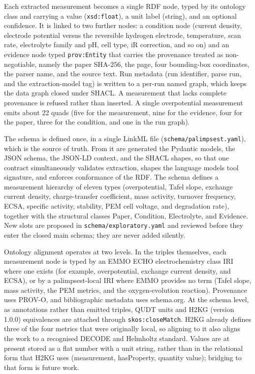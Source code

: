 Each extracted measurement becomes a single RDF node, typed by its
ontology class and carrying a value (\texttt{xsd:float}), a unit label
(string), and an optional confidence. It is linked to two further nodes:
a condition node (current density, electrode potential versus the
reversible hydrogen electrode, temperature, scan rate, electrolyte
family and pH, cell type, iR correction, and so on) and an evidence node
typed \texttt{prov:Entity} that carries the provenance treated as
non-negotiable, namely the paper SHA-256, the page, four bounding-box
coordinates, the parser name, and the source text. Run metadata (run
identifier, parse run, and the extraction-model tag) is written to a
per-run named graph, which keeps the data graph closed under SHACL. A
measurement that lacks complete provenance is refused rather than
inserted. A single overpotential measurement emits about 22 quads (five
for the measurement, nine for the evidence, four for the paper, three
for the condition, and one in the run graph).

The schema is defined once, in a single LinkML file
(\texttt{schema/palimpsest.yaml}), which is the source of truth. From it
are generated the Pydantic models, the JSON schema, the JSON-LD context,
and the SHACL shapes, so that one contract simultaneously validates
extraction, shapes the language model\textquotesingle s tool signature,
and enforces conformance of the RDF. The schema defines a measurement
hierarchy of eleven types (overpotential, Tafel slope, exchange current
density, charge-transfer coefficient, mass activity, turnover frequency,
ECSA, specific activity, stability, PEM cell voltage, and degradation
rate), together with the structural classes Paper, Condition,
Electrolyte, and Evidence. New slots are proposed in
\texttt{schema/exploratory.yaml} and reviewed before they enter the
closed main schema; they are never added silently.

Ontology alignment operates at two levels. In the triples themselves,
each measurement node is typed by an EMMO ECHO electrochemistry class
IRI where one exists (for example, overpotential, exchange current
density, and ECSA), or by a palimpsest-local IRI where EMMO provides no
term (Tafel slope, mass activity, the PEM metrics, and the
oxygen-evolution reaction). Provenance uses PROV-O, and bibliographic
metadata uses schema.org. At the schema level, as annotations rather
than emitted triples, QUDT units and H2KG (version 1.0.0) equivalences
are attached through \texttt{skos:closeMatch}. H2KG already defines
three of the four metrics that were originally local, so aligning to it
also aligns the work to a recognised DECODE and Helmholtz standard.
Values are at present stored as a flat number with a unit string, rather
than in the relational form that H2KG uses (measurement, hasProperty,
quantity value); bridging to that form is future work.

